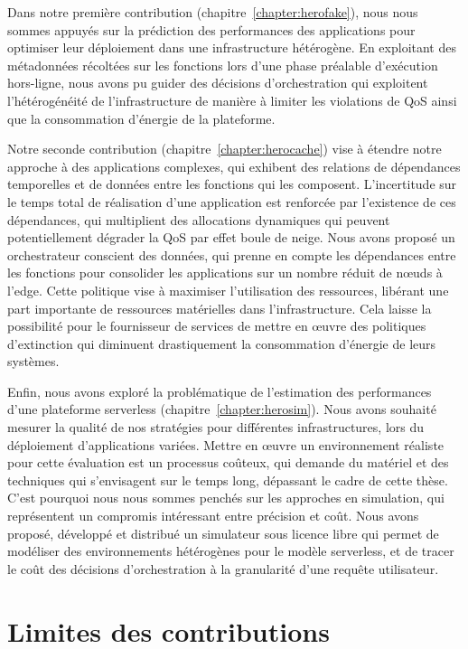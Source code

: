 Dans notre première contribution (chapitre~\ref{chapter:herofake}), nous nous sommes appuyés sur la prédiction des performances des applications pour optimiser leur déploiement dans une infrastructure hétérogène. En exploitant des métadonnées récoltées sur les fonctions lors d'une phase préalable d'exécution hors-ligne, nous avons pu guider des décisions d'orchestration qui exploitent l'hétérogénéité de l'infrastructure de manière à limiter les violations de \gls{QoS} ainsi que la consommation d'énergie de la plateforme.

Notre seconde contribution (chapitre~\ref{chapter:herocache}) vise à étendre notre approche à des applications complexes, qui exhibent des relations de dépendances temporelles et de données entre les fonctions qui les composent. L'incertitude sur le temps total de réalisation d'une application est renforcée par l'existence de ces dépendances, qui multiplient des allocations dynamiques qui peuvent potentiellement dégrader la \gls{QoS} par effet boule de neige. Nous avons proposé un orchestrateur conscient des données, qui prenne en compte les dépendances entre les fonctions pour consolider les applications sur un nombre réduit de nœuds à l'edge. Cette politique vise à maximiser l'utilisation des ressources, libérant une part importante de ressources matérielles dans l'infrastructure. Cela laisse la possibilité pour le fournisseur de services de mettre en œuvre des politiques d'extinction qui diminuent drastiquement la consommation d'énergie de leurs systèmes.

Enfin, nous avons exploré la problématique de l'estimation des performances d'une plateforme serverless (chapitre~\ref{chapter:herosim}). Nous avons souhaité mesurer la qualité de nos stratégies pour différentes infrastructures, lors du déploiement d'applications variées. Mettre en œuvre un environnement réaliste pour cette évaluation est un processus coûteux, qui demande du matériel et des techniques qui s'envisagent sur le temps long, dépassant le cadre de cette thèse. C'est pourquoi nous nous sommes penchés sur les approches en simulation, qui représentent un compromis intéressant entre précision et coût. Nous avons proposé, développé et distribué un simulateur sous licence libre qui permet de modéliser des environnements hétérogènes pour le modèle serverless, et de tracer le coût des décisions d'orchestration à la granularité d'une requête utilisateur.

\section{Limites des contributions}
\label{section:conclusion-limits}

